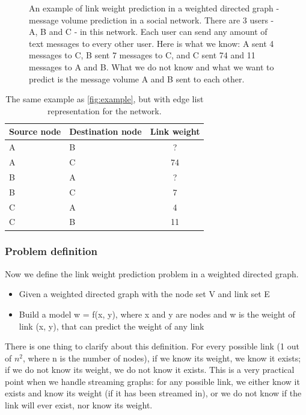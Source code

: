 \documentclass{article}
\begin{document}
\begin{figure}[!htb]\centering
	\caption{
		An example of link weight prediction in a weighted directed graph -
		message volume prediction in a social network.
		There are 3 users - A, B and C - in this network.
		Each user can send any amount of text messages to every other user.
		Here is what we know:
		A sent 4 messages to C,
		B sent 7 messages to C,
		and C sent 74 and 11 messages to A and B.
		What we do not know and what we want to predict is
		the message volume A and B sent to each other.
		}
	\label{fig:example}
\end{figure}
\begin{table}[!htb]\centering
	\caption{
		The same example as \autoref{fig:example}, but with edge list representation for the network.
	}
	\begin{tabularx}{0.6\textwidth}{|X|X|c|}  \hline \rowcolor{blue!40}
		Source node & Destination node & Link weight \\ \hline
		A & B & ? \\ \hline
		A & C & 74 \\ \hline
		B & A & ? \\ \hline
		B & C & 7 \\ \hline
		C & A & 4 \\ \hline
		C & B & 11 \\ \hline
	\end{tabularx}
	\label{tab:example}
\end{table}

\subsubsection{Problem definition}
Now we define the link weight prediction problem in a weighted directed graph.
\begin{itemize}
	\item Given a weighted directed graph with the node set V and link set E
	\item Build a model w = f(x, y), where x and y are nodes and w is the weight of link (x, y), that can predict the weight of any link
\end{itemize}
There is one thing to clarify about this definition.
For every possible link (1 out of $ n^2 $, where n is the number of nodes), 
if we know its weight, we know it exists;
if we do not know its weight, we do not know it exists.
This is a very practical point when we handle streaming graphs:
for any possible link,
we either know it exists and know its weight (if it has been streamed in), or we do not know if the link will ever exist, nor know its weight.
\end{document}
